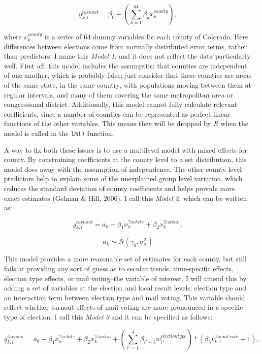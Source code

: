 \documentclass[12pt,twoside]{reedthesis}
\begin{document}
  \[y^{turnout}_{k,l} = \beta_0 + (\sum_{k=1}^{64}\beta_kx_k^{county}),\]
  
  where \(x_k^{county}\) is a series of 64 dummy variables for each county
  of Colorado. Here differences between elections come from normally
  distributed error terms, rather than predictors. I name this \emph{Model
  1}, and it does not reflect the data particularly well. First off, this
  model includes the assumption that counties are independent of one
  another, which is probably false; just consider that these counties are
  areas of the same state, in the same country, with populations moving
  between them at regular intervals, and many of them covering the same
  metropolitan area or congressional district. Additionally, this model
  cannot fully calculate relevant coefficients, since a number of counties
  can be represented as perfect linear functions of the other variables.
  This means they will be dropped by \textit{R} when the model is called
  in the \texttt{lm()} function.
  
  A way to fix both these issues is to use a multilevel model with mixed
  effects for county. By constraining coefficients at the county level to
  a set distribution, this model does away with the assumption of
  independence. The other county level predictors help to explain some of
  the unexplained group level variation, which reduces the standard
  deviation of county coefficients and helps provide more exact estimates
  (Gelman \& Hill, 2006). I call this \emph{Model 2}, which can be written
  as:
  
  \[y^{turnout}_{k,l} = a_{k} + \beta_{1}x_k^{\%white} + \beta_{2}x_k^{\%urban},\]
  
  \[a_{k} \sim N (\gamma_0, \sigma_{\alpha}^2)\]
  
  This model provides a more reasonable set of estimates for each county,
  but still fails at providing any sort of guess as to secular trends,
  time-specific effects, election type effects, or mail voting--the
  variable of interest. I will amend this by adding a set of variables at
  the election and local result levels: election type and an interaction
  term between election type and mail voting. This variable should reflect
  whether turnout effects of mail voting are more pronounced in a specific
  type of election. I call this \emph{Model 3} and it can be specified as
  follows:
  
  \[y^{turnout}_{k,l} = a_{k} + \beta_{1}x_k^{\% white} + \beta_{2}x_k^{\% urban} + (\sum_{i'=1}^{4}\beta_{i'+3}w_{i'}^{election type})*(\beta_3v_{k,l}^{\% mail~vote} + 1),\]
  
\end{document}
